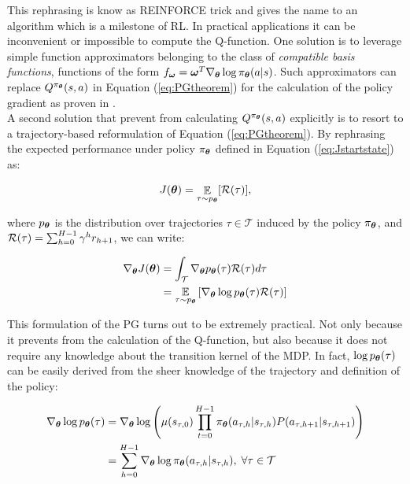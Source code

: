This rephrasing is know as REINFORCE trick \cite{williams1992simple} and gives the name to an algorithm which is a milestone of \gls{RL}.
In practical applications it can be inconvenient or impossible to compute the Q-function. One solution is to leverage simple function approximators belonging to the class of \emph{compatible basis functions}, \ie functions of the form $f_{\boldsymbol{\omega}}=\boldsymbol{\omega}^{T}\nabla_{\boldsymbol{\theta}}\log\pi_{\boldsymbol{\theta}}(a|s)$. Such approximators can replace $Q^{\pi_{\boldsymbol{\theta}}}(s,a)$ in Equation (\ref{eq:PGtheorem}) for the calculation of the policy gradient as proven in \cite{sutton2000policy}.\\
A second solution that prevent from calculating $Q^{\pi_{\boldsymbol{\theta}}}(s,a)$ explicitly is to resort to a trajectory-based reformulation of Equation (\ref{eq:PGtheorem}). By rephrasing the expected performance under policy $\pi_{\boldsymbol{\theta}}$ defined in Equation (\ref{eq:Jstartstate}) as:

\begin{align}
J(\boldsymbol{\theta}) = \mathop{\mathbb{E}}_{\tau\sim p_{\boldsymbol{\theta}}}[\mathcal{R}(\tau)], 
\end{align}

where $p_{\boldsymbol{\theta}}$ is the distribution over trajectories $\tau\in\mathcal{T}$ induced by the policy $\pi_{\boldsymbol{\theta}}$, and $\mathcal{R}(\tau) = \sum_{h=0}^{H-1}\gamma^{h}r_{h+1}$, we can write: 

\begin{align}
\nabla_{\boldsymbol{\theta}}J(\boldsymbol{\theta}) 
&= \int_{\mathcal{T}}\nabla_{\boldsymbol{\theta}}p_{\boldsymbol{\theta}}(\tau)\mathcal{R}(\tau)d\tau \\
&= \underset{\tau\sim p_{\boldsymbol{\theta}}}{\mathbb{E}}\left[{\nabla_{\boldsymbol{\theta}}\log p_{\boldsymbol{\theta}}(\tau)\mathcal{R}(\tau)}\right] \label{eq:trajectoryPG}
\end{align}

This formulation of the \gls{PG} turns out to be extremely practical. Not only because it prevents from the calculation of the Q-function, but also because it does not require any knowledge about the transition kernel of the \gls{MDP}. In fact, $\log p_{\boldsymbol{\theta}}(\tau)$ can be easily derived from the sheer knowledge of the trajectory and definition of the policy:

\begin{align}
\nabla_{\boldsymbol{\theta}}\log p_{\boldsymbol{\theta}}(\tau) 
&= \nabla_{\boldsymbol{\theta}}\log\left( \mu(s_{\tau,0})\prod_{t=0}^{H-1}\pi_{\boldsymbol{\theta}}(a_{\tau,h}|s_{\tau,h})P(a_{\tau,h+1}|s_{\tau,h+1})\right) \\
&= \sum_{h=0}^{H-1}\nabla_{\boldsymbol{\theta}}\log\pi_{\boldsymbol{\theta}}(a_{\tau,h}|s_{\tau,h}), \; \forall \tau\in\mathcal{T} \label{eq:logpolicyestimate}
\end{align}

